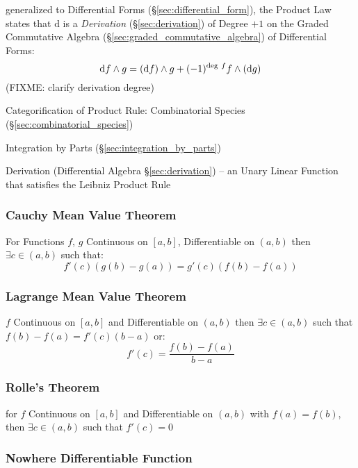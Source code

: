 generalized to Differential Forms (\S\ref{sec:differential_form}), the Product
Law states that $\mathrm{d}$ is a \emph{Derivation} (\S\ref{sec:derivation}) of
Degree $+1$ on the Graded Commutative Algebra
(\S\ref{sec:graded_commutative_algebra}) of Differential Forms:
\[
\mathrm{d}f \wedge g = (\mathrm{d}f) \wedge g +
  (-1)^{\mathrm{deg}\ f}f \wedge (\mathrm{d}g)
\]
(FIXME: clarify derivation degree)

Categorification of Product Rule: Combinatorial Species
(\S\ref{sec:combinatorial_species}) %

\fist Integration by Parts (\S\ref{sec:integration_by_parts})

\fist Derivation (Differential Algebra \S\ref{sec:derivation}) -- an Unary
Linear Function that satisfies the Leibniz Product Rule



\subsubsection{Cauchy Mean Value Theorem}
\label{sec:cauchy_mean_value}

For Functions $f$, $g$ Continuous on $[a,b]$, Differentiable on
$(a,b)$ then $\exists c \in (a,b)$ such that:
\[
  f'(c) (g(b) - g(a)) = g'(c) (f(b) - f(a))
\]



\subsubsection{Lagrange Mean Value Theorem}
\label{sec:lagrange_mean_value}

$f$ Continuous on $[a,b]$ and Differentiable on $(a,b)$ then $\exists
c \in (a,b)$ such that $f(b) - f(a) = f'(c)(b-a)$ or:
\[
  f'(c) = \frac{f(b) - f(a)}{b - a}
\]



\subsubsection{Rolle's Theorem}\label{sec:rolles_theorem}

for $f$ Continuous on $[a,b]$ and Differentiable on $(a,b)$ with $f(a)
= f(b)$, then $\exists c \in (a,b)$ such that $f'(c) = 0$



\subsubsection{Nowhere Differentiable Function}
\label{sec:nowhere_differentiable}

